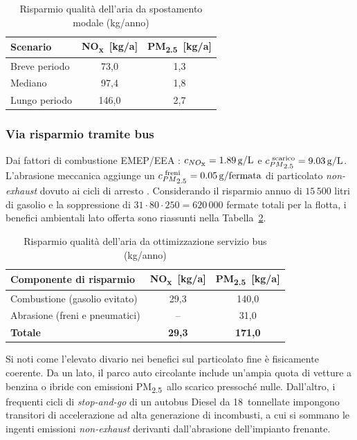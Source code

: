 \documentclass[conference]{IEEEtran}
\newcommand{\nox}{NO\textsubscript{x}}
\newcommand{\pmtwo}{PM\textsubscript{2.5}}
\begin{document}
\begin{table}[htbp]
\caption{Risparmio qualità dell'aria da spostamento modale (kg/anno)}
\label{tab:aq_shift}
\centering
\renewcommand{\arraystretch}{1.15}
\begin{tabular}{@{}lcc@{}}
\toprule
Scenario & \nox\ [kg/a] & \pmtwo\ [kg/a] \\
\midrule
Breve periodo & 73,0  & 1,3 \\
Mediano       & 97,4  & 1,8 \\
Lungo periodo & 146,0 & 2,7 \\
\bottomrule
\end{tabular}
\end{table}

\subsubsection{Via risparmio tramite bus}
Dai fattori di combustione EMEP/EEA \cite{eea_guidebook2025}:
$c_{\nox} = \SI{1.89}{g/L}$ e
$c_{\pmtwo}^{\text{ scarico}} = \SI{9.03}{g/L}$.
L'abrasione meccanica aggiunge un $c_{\pmtwo}^{\text{ freni}} = \SI{0.05}{g/fermata}$ di particolato \textit{non-exhaust} dovuto ai cicli di arresto \cite{hbefa2022}.
Considerando il risparmio annuo di $15\,500$ litri di gasolio e la soppressione di $31 \cdot 80 \cdot 250 = 620\,000$ fermate totali per la flotta, i benefici ambientali lato offerta sono riassunti nella Tabella~\ref{tab:aq_bus}.

\begin{table}[htbp]
\caption{Risparmio qualità dell'aria da ottimizzazione servizio bus (kg/anno)}
\label{tab:aq_bus}
\centering
\renewcommand{\arraystretch}{1.15}
\begin{tabular}{@{}lcc@{}}
\toprule
Componente di risparmio & \nox\ [kg/a] & \pmtwo\ [kg/a] \\
\midrule
Combustione (gasolio evitato) & 29,3 & 140,0 \\
Abrasione (freni e pneumatici) & -- & 31,0 \\
\midrule
\textbf{Totale} & \textbf{29,3} & \textbf{171,0} \\
\bottomrule
\end{tabular}
\end{table}
Si noti come l'elevato divario nei benefici sul particolato fine è fisicamente coerente. Da un lato, il parco auto circolante include un'ampia quota di vetture a benzina o ibride con emissioni \pmtwo\ allo scarico pressoché nulle. Dall'altro, i frequenti cicli di \textit{stop-and-go} di un autobus Diesel da 18~tonnellate impongono transitori di accelerazione ad alta generazione di incombusti, a cui si sommano le ingenti emissioni \textit{non-exhaust} derivanti dall'abrasione dell'impianto frenante.
\end{document}
